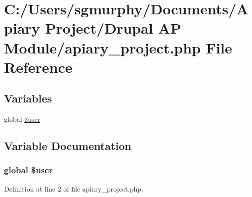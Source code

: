 \hypertarget{apiary__project_8php}{
\section{C:/Users/sgmurphy/Documents/Apiary Project/Drupal AP Module/apiary\_\-project.php File Reference}
\label{apiary__project_8php}
}
\subsection*{Variables}
\begin{DoxyCompactItemize}
\item 
global \hyperlink{apiary__project_8php_a00365e6c5f70c43fb2ed86c9bc5626e0}{\$user}
\end{DoxyCompactItemize}


\subsection{Variable Documentation}
\hypertarget{apiary__project_8php_a00365e6c5f70c43fb2ed86c9bc5626e0}{
\subsubsection[{\$user}]{\setlength{\rightskip}{0pt plus 5cm}global \$user}}
\label{apiary__project_8php_a00365e6c5f70c43fb2ed86c9bc5626e0}


Definition at line 2 of file apiary\_\-project.php.

